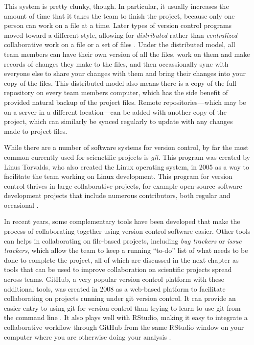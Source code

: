 \documentclass[]{tufte-book}
\begin{document}
This system is pretty clunky, though. In particular, it usually increases the
amount of time that it takes the team to finish the project, because only one
person can work on a file at a time. Later types of version control programs
moved toward a different style, allowing for \emph{distributed} rather than
\emph{centralized} collaborative work on a file or a set of files
\citep{raymondunderstanding, irving2011astonishments}. Under the distributed model,
all team members can have their own version of all the files, work on them and
make records of changes they make to the files, and then occassionally sync with
everyone else to share your changes with them and bring their changes into your
copy of the files. This distributed model also means there is a copy of the full
repository on every team members computer, which has the side benefit of
provided natural backup of the project files. Remote repositories---which may be
on a server in a different location---can be added with another copy of the
project, which can similarly be synced regularly to update with any changes made
to project files.

While there are a number of software systems for version control, by far the
most common currently used for scienctific projects is \emph{git}. This program was
created by Linus Torvalds, who also created the Linux operating system, in 2005
as a way to facilitate the team working on Linux development. This program for
version control thrives in large collaborative projects, for example open-source
software development projects that include numerous contributors, both regular
and occasional \citep{brown2018git}.

In recent years, some complementary tools have been developed that make the
process of collaborating together using version control software easier. Other
tools can helps in collaborating on file-based projects, including \emph{bug
trackers} or \emph{issue trackers}, which allow the team to keep a running ``to-do''
list of what needs to be done to complete the project, all of which are
discussed in the next chapter as tools that can be used to improve collaboration
on scientific projects spread across teams. GitHub, a very popular version
control platform with these additional tools, was created in 2008 as a web-based
platform to facilitate collaborating on projects running under git version
control. It can provide an easier entry to using git for version control than
trying to learn to use git from the command line \citep{perez2016ten}. It also plays
well with RStudio, making it easy to integrate a collaborative workflow through
GitHub from the same RStudio window on your computer where you are otherwise
doing your analysis \citep{perez2016ten}.
\end{document}
